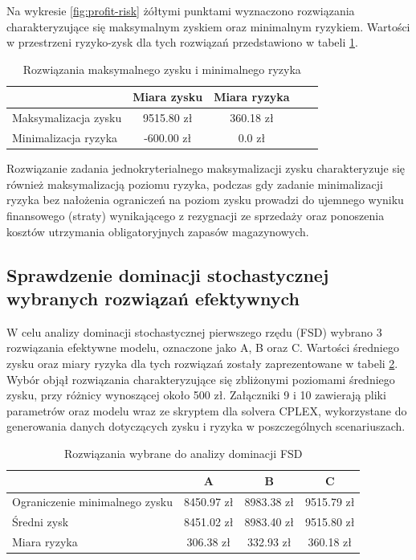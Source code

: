 \documentclass[11pt,a4paper]{article}
\begin{document}
Na wykresie \ref{fig:profit-risk} żółtymi punktami wyznaczono rozwiązania charakteryzujące się maksymalnym zyskiem oraz minimalnym ryzykiem. Wartości w przestrzeni ryzyko-zysk dla tych rozwiązań przedstawiono w tabeli \ref{tab:min-max}.

\begin{table}[ht!]
\label{tab:min-max}
  \caption{Rozwiązania maksymalnego zysku i minimalnego ryzyka}
  \centering
  \begin{tabular}{l*{4}{c}}
  
  	\hline
              			& Miara zysku & Miara ryzyka \\
	\hline
	Maksymalizacja zysku	& 9515.80 zł & 360.18 zł \\
	Minimalizacja ryzyka   	& -600.00 zł & 0.0 zł \\ 
	\hline
	
	\end{tabular}
	\end{table}
	
Rozwiązanie zadania jednokryterialnego maksymalizacji zysku charakteryzuje się również maksymalizacją poziomu ryzyka, podczas gdy zadanie minimalizacji ryzyka bez nałożenia ograniczeń na poziom zysku prowadzi do ujemnego wyniku finansowego (straty) wynikającego z rezygnacji ze sprzedaży oraz ponoszenia kosztów utrzymania obligatoryjnych zapasów magazynowych.

\subsection{Sprawdzenie dominacji stochastycznej wybranych rozwiązań efektywnych}

W celu analizy dominacji stochastycznej pierwszego rzędu (FSD) wybrano 3 rozwiązania efektywne modelu, oznaczone jako A, B oraz C. Wartości średniego zysku oraz miary ryzyka dla tych rozwiązań zostały zaprezentowane w tabeli \ref{tab:abc}. Wybór objął rozwiązania charakteryzujące się zbliżonymi poziomami średniego zysku, przy różnicy wynoszącej około 500 zł. Załączniki 9 i 10 zawierają pliki parametrów oraz modelu wraz ze skryptem dla solvera CPLEX, wykorzystane do generowania danych dotyczących zysku i ryzyka w poszczególnych scenariuszach.

\begin{table}[ht!]
  \label{tab:abc}
  \caption{Rozwiązania wybrane do analizy dominacji FSD}
  \centering
  \begin{tabular}{lccc}
  	\hline
              			& A & B & C \\
	\hline
	Ograniczenie minimalnego zysku	& 8450.97 zł & 8983.38 zł & 9515.79 zł\\
	Średni zysk   	& 8451.02 zł & 8983.40 zł & 9515.80 zł\\
	Miara ryzyka   	& 306.38 zł & 332.93 zł & 360.18 zł\\ 
	\hline
	\end{tabular}
\end{table}
\end{document}
